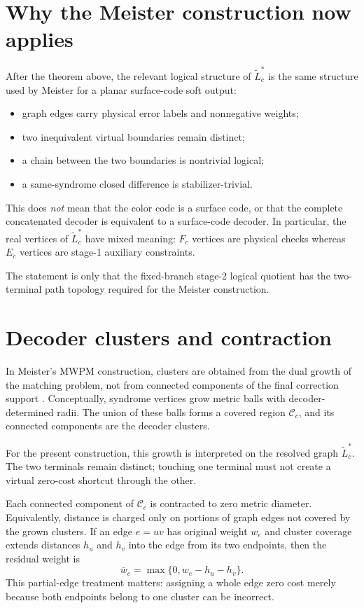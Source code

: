 \documentclass[11pt]{article}
\begin{document}
\section{Why the Meister construction now applies}

After the theorem above, the relevant logical structure of
$\widetilde L_c^*$ is the same structure used by Meister for a planar
surface-code soft output:
\begin{itemize}
  \item graph edges carry physical error labels and nonnegative weights;
  \item two inequivalent virtual boundaries remain distinct;
  \item a chain between the two boundaries is nontrivial logical;
  \item a same-syndrome closed difference is stabilizer-trivial.
\end{itemize}

This does \emph{not} mean that the color code is a surface code, or that the
complete concatenated decoder is equivalent to a surface-code decoder. In
particular, the real vertices of $\widetilde L_c^*$ have mixed meaning:
$F_c$ vertices are physical checks whereas $E_c$ vertices are stage-1
auxiliary constraints.

The statement is only that the fixed-branch stage-2 logical quotient has the
two-terminal path topology required for the Meister construction.

\section{Decoder clusters and contraction}

In Meister's MWPM construction, clusters are obtained from the dual growth of
the matching problem, not from connected components of the final correction
support \cite{Meister}. Conceptually, syndrome vertices grow metric balls with
decoder-determined radii. The union of these balls forms a covered region
$\mathcal C_c$, and its connected components are the decoder clusters.

For the present construction, this growth is interpreted on the resolved
graph $\widetilde L_c^*$. The two terminals remain distinct; touching one
terminal must not create a virtual zero-cost shortcut through the other.

Each connected component of $\mathcal C_c$ is contracted to zero metric
diameter. Equivalently, distance is charged only on portions of graph edges
not covered by the grown clusters. If an edge $e=uv$ has original weight
$w_e$ and cluster coverage extends distances $h_u$ and $h_v$ into the edge
from its two endpoints, then the residual weight is
\[
  \bar w_e=\max\{0,w_e-h_u-h_v\}.
\]
This partial-edge treatment matters: assigning a whole edge zero cost merely
because both endpoints belong to one cluster can be incorrect.
\end{document}
